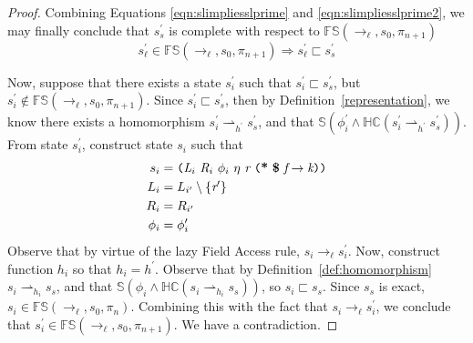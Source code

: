 \begin{proof}
Combining Equations \ref{eqn:slimpliesslprime} and \ref{eqn:slimpliesslprime2}, we may finally conclude that $s_s^\prime$ is complete with respect to $\mathbb{FS}(\rightarrow_{\ell},s_0,\pi_{n+1})$
\begin{equation}
\label{eqn:readforwards}
s_\ell^\prime \in \mathbb{FS}(\rightarrow_{\ell},s_0,\pi_{n+1}) \Rightarrow s_\ell^\prime \sqsubset s_s^\prime
\end{equation}


Now, suppose that there exists a state $s_i^\prime$ such that $s_i^\prime \sqsubset s_s^\prime$, but $s_i^\prime \notin \mathbb{FS}(\rightarrow_{\ell},s_0,\pi_{n+1})$. Since $s_i^\prime \sqsubset s_s^\prime$, then by Definition~\ref{representation}, we know there exists a homomorphism $s_i^\prime \rightharpoonup_{h^\prime} s_s^\prime$, and that $\mathbb{S}( \phi_i^\prime \wedge \mathbb{HC}(s_i^\prime \rightharpoonup_{h^\prime} s_s^\prime) )$. From state $s_i^\prime$, construct state $s_i$ such that 
\begin{align*}
s_i &= \lp \cfgnt{L}_{i}\ \cfgnt{R}_{i}\ \phi_i\ \eta\ \cfgnt{r}\ \lp \cfgt{*}\ \cfgt{\$}\ \cfgnt{f} \rightarrow \cfgnt{k}\rp \rp\\
L_i &= L_{i^\prime} \setminus \{\cfgnt{r}^\prime \}\\
R_i &= R_{i^\prime}\\
\phi_i &= \phi_i^\prime
\end{align*}
Observe that by virtue of the lazy Field Access rule, $s_i \rightarrow_\ell s_i^\prime$. Now, construct function $h_i$ so that $h_i = h^\prime$. Observe that by Definition~\ref{def:homomorphism} $s_i \rightharpoonup_{h_i} s_s$,  and that $\mathbb{S}( \phi_i \wedge \mathbb{HC}(s_i \rightharpoonup_{h_i} s_s) )$, so $s_i \sqsubset s_s$. Since $s_s$ is exact, $s_i \in\mathbb{FS}(\rightarrow_{\ell},s_0,\pi_n)$. Combining this with the fact that $s_i \rightarrow_\ell s_i^\prime$, we conclude that $s_i^\prime \in \mathbb{FS}(\rightarrow_{\ell},s_0,\pi_{n+1})$. We have a contradiction.


\end{proof}
